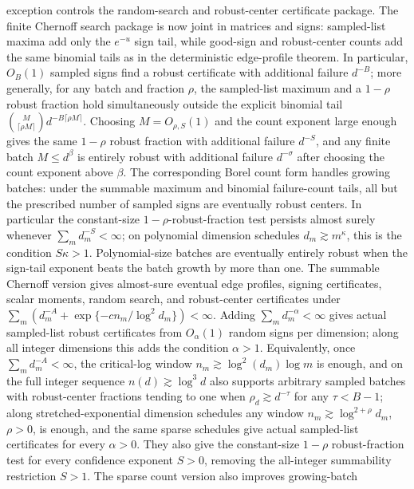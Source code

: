 \documentclass[11pt]{article}
\begin{document}
exception controls the random-search and robust-center certificate package.
The finite Chernoff search package is now joint in matrices and signs:
sampled-list maxima add only the \(e^{-u}\) sign tail, while good-sign and
robust-center counts add the same binomial tails as in the deterministic
edge-profile theorem.  In particular, \(O_B(1)\) sampled signs find a robust
certificate with additional failure \(d^{-B}\); more generally, for any batch
and fraction \(\rho\), the sampled-list maximum and a \(1-\rho\) robust fraction
hold simultaneously outside the explicit binomial tail
\(\binom{M}{\lceil\rho M\rceil}d^{-B\lceil\rho M\rceil}\).  Choosing
\(M=O_{\rho,S}(1)\) and the count exponent large enough gives the same
\(1-\rho\) robust fraction with additional failure \(d^{-S}\), and any finite batch
\(M\le d^\beta\) is entirely robust with additional failure \(d^{-\sigma}\)
after choosing the count exponent above \(\beta\).  The corresponding Borel count
form handles growing batches: under the summable maximum and binomial
failure-count tails, all but the prescribed number of sampled signs are
eventually robust centers.  In particular the constant-size
\(1-\rho\)-robust-fraction test persists almost surely whenever
\(\sum_m d_m^{-S}<\infty\); on polynomial dimension schedules
\(d_m\gtrsim m^\kappa\), this is the condition \(S\kappa>1\).  Polynomial-size batches are eventually entirely
robust when the sign-tail exponent beats the batch growth by more than one.  The
summable Chernoff version gives almost-sure eventual edge profiles, signing
certificates, scalar moments, random search, and robust-center certificates under
\(\sum_m(d_m^{-A}+\exp\{-c n_m/\log^2 d_m\})<\infty\).  Adding
\(\sum_m d_m^{-\alpha}<\infty\) gives actual sampled-list robust certificates
from \(O_\alpha(1)\) random signs per dimension; along all integer dimensions
this adds the condition \(\alpha>1\).  Equivalently, once
\(\sum_m d_m^{-A}<\infty\), the critical-log window
\(n_m\gtrsim\log^2(d_m)\log m\) is enough, and on the full integer sequence
\(n(d)\gtrsim\log^3d\) also supports arbitrary sampled batches with robust-center
fractions tending to one when \(\rho_d\gtrsim d^{-\tau}\) for any \(\tau<B-1\);
along stretched-exponential
dimension schedules any window \(n_m\gtrsim\log^{2+\rho}d_m\), \(\rho>0\), is
enough, and the same sparse schedules give actual sampled-list certificates for
every \(\alpha>0\).  They also give the constant-size \(1-\rho\)
robust-fraction test for every confidence exponent \(S>0\), removing the
all-integer summability restriction \(S>1\).  The sparse count version also improves growing-batch
\end{document}
